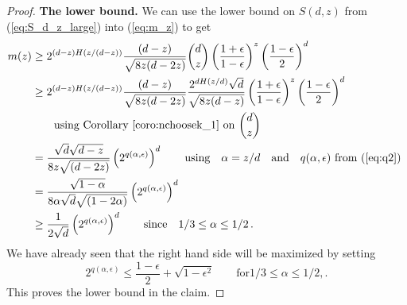 \begin{proof}
\textbf{The lower bound.} We can use the lower bound on $S(d, z)$ from (\ref{eq:S_d_z_large}) into (\ref{eq:m_z}) to get
\begin{align*}
m(z) 
&\geq 2^{(d-z)H(z/(d- z))}\frac{(d-z)}{\sqrt{8z(d-2z)}} 
{d \choose z} \left(\frac{1+\epsilon}{1-\epsilon}\right)^{z} 
\left(\frac{1-\epsilon}{2}\right)^{d} \\
&\geq 2^{(d-z)H(z/(d- z))}\frac{(d-z)}{\sqrt{8z(d-2z)} } \frac{2^{d H(z/d)} \sqrt{d}}{\sqrt{8z(d-z)} }
\left(\frac{1+\epsilon}{1-\epsilon}\right)^{z} \left(\frac{1-\epsilon}{2}\right)^{d} \\
&\qquad \text{using Corollary~\ref{coro:nchoosek_1} on }{d \choose z}\\
&= \frac{\sqrt{d} \sqrt{d-z}}{8z\sqrt{(d-2z)} } 
\left( 2^{q(\alpha, \epsilon)}\right)^{d} \qquad \text{using}\quad \alpha = z/d \quad \text{and} \quad q(\alpha, \epsilon) \text{ from (\ref{eq:q2}) }\\
&= \frac{\sqrt{1-\alpha}}{8\alpha \sqrt{d} \sqrt{(1-2\alpha)} } 
\left( 2^{q(\alpha, \epsilon)}\right)^{d} \\
&\geq \frac{1}{2\sqrt{d}} 
\left( 2^{q(\alpha, \epsilon)}\right)^{d} \qquad \text{since}\quad 1/3 \leq \alpha \leq 1/2\, .
\end{align*}
We have already seen that the right hand side will be maximized by setting
\[
2^{q(\alpha, \epsilon)} \leq \frac{1-\epsilon}{2} + \sqrt{1-\epsilon^2} \qquad \text{for} 1/3 \leq \alpha \leq 1/2, .
\]
This proves the lower bound in the claim.
\end{proof}






